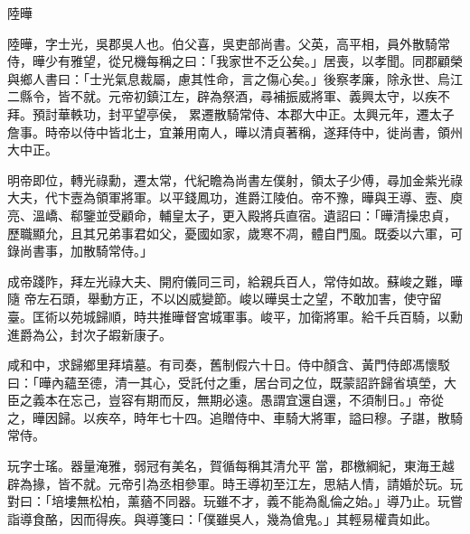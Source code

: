 
\begin{pinyinscope}
陸曄



 陸曄，字士光，吳郡吳人也。伯父喜，吳吏部尚書。父英，高平相，員外散騎常侍，曄少有雅望，從兄機每稱之曰：「我家世不乏公矣。」居喪，以孝聞。同郡顧榮與鄉人書曰：「士光氣息裁屬，慮其性命，言之傷心矣。」後察孝廉，除永世、烏江二縣令，皆不就。元帝初鎮江左，辟為祭酒，尋補振威將軍、義興太守，以疾不拜。預討華軼功，封平望亭侯，
 累遷散騎常侍、本郡大中正。太興元年，遷太子詹事。時帝以侍中皆北士，宜兼用南人，曄以清貞著稱，遂拜侍中，徙尚書，領州大中正。



 明帝即位，轉光祿勳，遷太常，代紀瞻為尚書左僕射，領太子少傅，尋加金紫光祿大夫，代卞壼為領軍將軍。以平錢鳳功，進爵江陵伯。帝不豫，曄與王導、壼、庾亮、溫嶠、郗鑒並受顧命，輔皇太子，更入殿將兵直宿。遺詔曰：「曄清操忠貞，歷職顯允，且其兄弟事君如父，憂國如家，歲寒不凋，體自門風。既委以六軍，可錄尚書事，加散騎常侍。」



 成帝踐阼，拜左光祿大夫、開府儀同三司，給親兵百人，常侍如故。蘇峻之難，曄隨
 帝左石頭，舉動方正，不以凶威變節。峻以曄吳士之望，不敢加害，使守留臺。匡術以苑城歸順，時共推曄督宮城軍事。峻平，加衛將軍。給千兵百騎，以勳進爵為公，封次子嘏新康子。



 咸和中，求歸鄉里拜墳墓。有司奏，舊制假六十日。侍中顏含、黃門侍郎馮懷駁曰：「曄內蘊至德，清一其心，受託付之重，居台司之位，既蒙詔許歸省填塋，大臣之義本在忘己，豈容有期而反，無期必遠。愚謂宜還自還，不須制日。」帝從之，曄因歸。以疾卒，時年七十四。追贈侍中、車騎大將軍，謚曰穆。子諶，散騎常侍。



 玩字士瑤。器量淹雅，弱冠有美名，賀循每稱其清允平
 當，郡檄綱紀，東海王越辟為掾，皆不就。元帝引為丞相參軍。時王導初至江左，思結人情，請婚於玩。玩對曰：「培塿無松柏，薰蕕不同器。玩雖不才，義不能為亂倫之始。」導乃止。玩嘗詣導食酪，因而得疾。與導箋曰：「僕雖吳人，幾為傖鬼。」其輕易權貴如此。




\end{pinyinscope}
